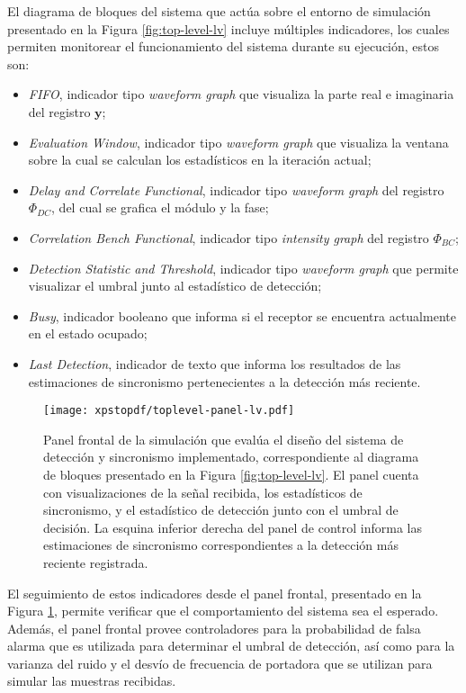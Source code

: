 El diagrama de bloques del sistema que actúa sobre el entorno de simulación presentado en la Figura \ref{fig:top-level-lv} incluye múltiples indicadores, los cuales permiten monitorear el funcionamiento del sistema durante su ejecución, estos son:
\begin{itemize}
    \item \textit{FIFO}, indicador tipo \textit{waveform graph} que visualiza la parte real e imaginaria del registro $\mathbf{y}$;
    \item \textit{Evaluation Window}, indicador tipo \textit{waveform graph} que visualiza la ventana sobre la cual se calculan los estadísticos en la iteración actual;
    \item \textit{Delay and Correlate Functional}, indicador tipo \textit{waveform graph} del registro $\Phi_{DC}$, del cual se grafica el módulo y la fase;
    \item \textit{Correlation Bench Functional}, indicador tipo \textit{intensity graph} del registro $\Phi_{BC}$;
    \item \textit{Detection Statistic and Threshold}, indicador tipo \textit{waveform graph} que permite visualizar el umbral junto al estadístico de detección;
    \item \textit{Busy}, indicador booleano que informa si el receptor se encuentra actualmente en el estado ocupado;
    \item \textit{Last Detection}, indicador de texto que informa los resultados de las estimaciones de sincronismo pertenecientes a la detección más reciente.
\end{itemize}

\begin{figure}[t]
    \centering{}\texttt{[image: xpstopdf/toplevel-panel-lv.pdf]}
    \caption[Panel frontal de la simulación en LabVIEW del sistema de detección y sincronismo implementado.]{Panel frontal de la simulación que evalúa el diseño del sistema de detección y sincronismo implementado, correspondiente al diagrama de bloques presentado en la Figura \ref{fig:top-level-lv}. El panel cuenta con visualizaciones de la señal recibida, los estadísticos de sincronismo, y el estadístico de detección junto con el umbral de decisión. La esquina inferior derecha del panel de control informa las estimaciones de sincronismo correspondientes a la detección más reciente registrada.\label{fig:visualización-lv}}  
\end{figure}

El seguimiento de estos indicadores desde el panel frontal, presentado en la Figura \ref{fig:visualización-lv}, permite verificar que el comportamiento del sistema sea el esperado. Además, el panel frontal provee controladores para la probabilidad de falsa alarma que es utilizada para determinar el umbral de detección, así como para la varianza del ruido y el desvío de frecuencia de portadora que se utilizan para simular las muestras recibidas.



